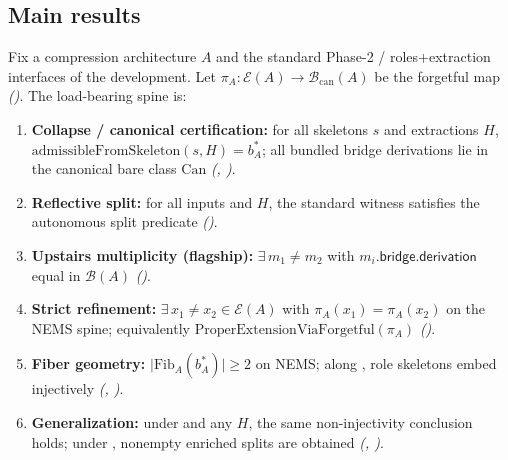 \documentclass[11pt]{article}
\begin{document}
\subsection{Main results}\label{sec:intro-package}
\begin{theorem}\label{thm:main-results}
Fix a compression architecture $A$ and the standard Phase-2 / roles+extraction interfaces of the development. Let $\pi_A : \mathcal{E}(A) \to \mathcal{B}_{\mathrm{can}}(A)$ be the forgetful map \emph{()}. The load-bearing spine is:
\begin{enumerate}[label=(\arabic*),itemsep=0.35em]
    \item \textbf{Collapse / canonical certification:} for all skeletons $s$ and extractions $H$,
    \newline\phantom{m}\ $\mathrm{admissibleFromSkeleton}(s,H) = b^\ast_A$; all bundled bridge derivations lie in the canonical bare class $\mathrm{Can}$ \emph{(, )}.
    \item \textbf{Reflective split:} for all  inputs and $H$, the standard witness satisfies the autonomous split predicate \emph{()}.
    \item \textbf{Upstairs multiplicity (flagship):} $\exists\, m_1 \neq m_2$ with $m_i.\mathsf{bridge}.\mathsf{derivation}$ equal in $\mathcal{B}(A)$ \emph{()}.
    \item \textbf{Strict refinement:} $\exists\, x_1 \neq x_2 \in \mathcal{E}(A)$ with $\pi_A(x_1) = \pi_A(x_2)$ on the NEMS spine; equivalently $\mathrm{ProperExtensionViaForgetful}(\pi_A)$ \emph{()}.
    \item \textbf{Fiber geometry:} $\lvert \mathrm{Fib}_A(b^\ast_A) \rvert \geq 2$ on NEMS; along , role skeletons embed injectively \emph{(, )}.
    \item \textbf{Generalization:} under  and any $H$, the same non-injectivity conclusion holds; under , nonempty enriched splits are obtained \emph{(, )}.
\end{enumerate}
\end{theorem}

\begin{center}
\end{center}
\end{document}
